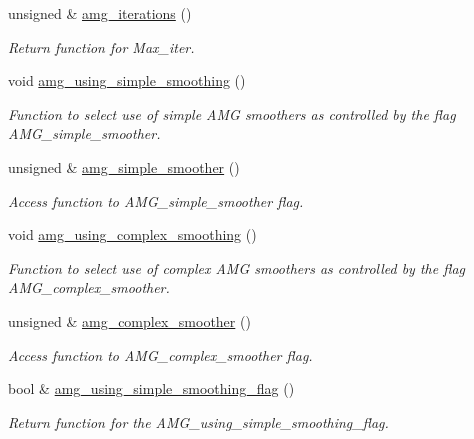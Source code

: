 \begin{DoxyCompactItemize}
unsigned \& \hyperlink{classoomph_1_1HyprePreconditioner_a1fa211b49730947fe525156d08b66da4}{amg\+\_\+iterations} ()
\begin{DoxyCompactList}\small\item\em Return function for Max\+\_\+iter. \end{DoxyCompactList}\item 
void \hyperlink{classoomph_1_1HyprePreconditioner_a7d4e9b31759555c67d51c0418de2980e}{amg\+\_\+using\+\_\+simple\+\_\+smoothing} ()
\begin{DoxyCompactList}\small\item\em Function to select use of \textquotesingle{}simple\textquotesingle{} A\+MG smoothers as controlled by the flag A\+M\+G\+\_\+simple\+\_\+smoother. \end{DoxyCompactList}\item 
unsigned \& \hyperlink{classoomph_1_1HyprePreconditioner_a0abc961b0dfacd9b6bf7e1da428ab484}{amg\+\_\+simple\+\_\+smoother} ()
\begin{DoxyCompactList}\small\item\em Access function to A\+M\+G\+\_\+simple\+\_\+smoother flag. \end{DoxyCompactList}\item 
void \hyperlink{classoomph_1_1HyprePreconditioner_a65c4923b3332f92c1712a1da86d1da9e}{amg\+\_\+using\+\_\+complex\+\_\+smoothing} ()
\begin{DoxyCompactList}\small\item\em Function to select use of \textquotesingle{}complex\textquotesingle{} A\+MG smoothers as controlled by the flag A\+M\+G\+\_\+complex\+\_\+smoother. \end{DoxyCompactList}\item 
unsigned \& \hyperlink{classoomph_1_1HyprePreconditioner_ab4a47036de2b2992259863716f6f9121}{amg\+\_\+complex\+\_\+smoother} ()
\begin{DoxyCompactList}\small\item\em Access function to A\+M\+G\+\_\+complex\+\_\+smoother flag. \end{DoxyCompactList}\item 
bool \& \hyperlink{classoomph_1_1HyprePreconditioner_a7d849ee9489020e7a58bec0f5d33700e}{amg\+\_\+using\+\_\+simple\+\_\+smoothing\+\_\+flag} ()
\begin{DoxyCompactList}\small\item\em Return function for the A\+M\+G\+\_\+using\+\_\+simple\+\_\+smoothing\+\_\+flag. \end{DoxyCompactList}\item 

\end{DoxyCompactItemize}
